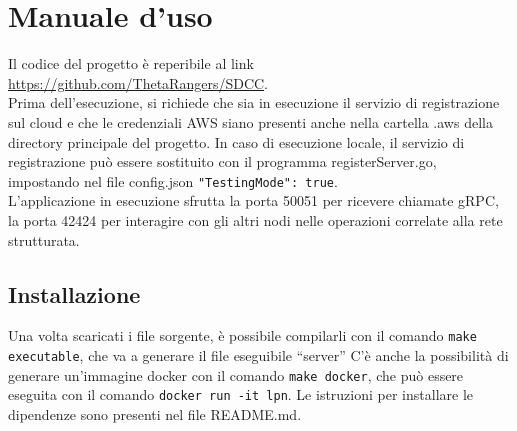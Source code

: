 \documentclass[conference]{IEEEtran}
\begin{document}
\section{Manuale d'uso}
Il codice del progetto è reperibile al link \href{https://github.com/ThetaRangers/SDCC}{https://github.com/ThetaRangers/SDCC}.\\
Prima dell'esecuzione, si richiede che sia in esecuzione il servizio di registrazione sul cloud e che le credenziali
AWS siano presenti anche nella cartella .aws della directory principale del progetto. In caso di esecuzione locale, il servizio
di registrazione può essere sostituito con il programma registerServer.go, impostando nel file config.json \verb!"TestingMode": true!.\\
L'applicazione in esecuzione sfrutta la porta 50051 per ricevere
chiamate gRPC, la porta 42424 per interagire con gli altri nodi nelle operazioni correlate alla rete strutturata.

\subsection{Installazione}
Una volta scaricati i file sorgente, è possibile compilarli con il comando \verb!make executable!, che va a generare il
file eseguibile ``server'' C'è anche la possibilità di generare un'immagine docker con il comando \verb!make docker!, che
può essere eseguita con il comando \verb!docker run -it lpn!. Le istruzioni per installare le dipendenze sono presenti nel
file README.md.
\end{document}
